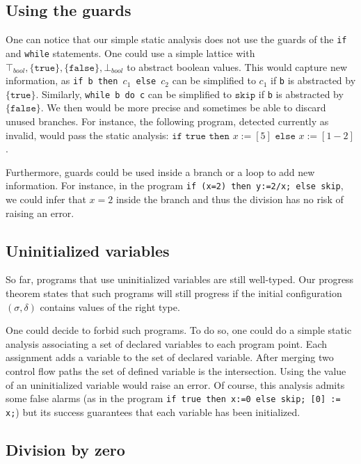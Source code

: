 \subsection*{Using the guards}
One can notice that our simple static analysis does not use the guards of the \texttt{if} and \texttt{while} statements. One could use a simple lattice with $\top_{bool}, \lbrace \texttt{true} \rbrace, \lbrace \texttt{false} \rbrace, \bot_{bool}$ to abstract boolean values. This would capture new information, as \texttt{if b then $c_1$ else $c_2$} can be simplified to $c_1$ if \texttt{b} is abstracted by $\lbrace \texttt{true} \rbrace$.
Similarly, \texttt{while b do c} can be simplified to $\texttt{skip}$ if \texttt{b} is abstracted by $\lbrace \texttt{false} \rbrace$.
We then would be more precise and sometimes be able to discard unused branches.
For instance, the following program, detected currently as invalid, would pass the static analysis: $\texttt{if true then~} x:= [5] \texttt{~else~} x:= [1 - 2]$.

Furthermore, guards could be used inside a branch or a loop to add new information. For instance, in the program \texttt{if (x=2) then y:=2/x; else skip}, we could infer that $x=2$ inside the branch and thus the division has no risk of raising an error.

\subsection*{Uninitialized variables}

So far, programs that use uninitialized variables are still well-typed. Our progress theorem states that such programs will still progress if the initial configuration $(\sigma,\delta)$ contains values of the right type.

One could decide to forbid such programs. To do so, one could do a simple static analysis associating a set of declared variables to each program point. Each assignment adds a variable to the set of declared variable. After merging two control flow paths the set of defined variable is the intersection. Using the value of an uninitialized variable would raise an error. Of course, this analysis admits some false alarms (as in the program \texttt{if true then x:=0 else skip; [0] := x;}) but its success guarantees that each variable has been initialized. 

\subsection*{Division by zero}

